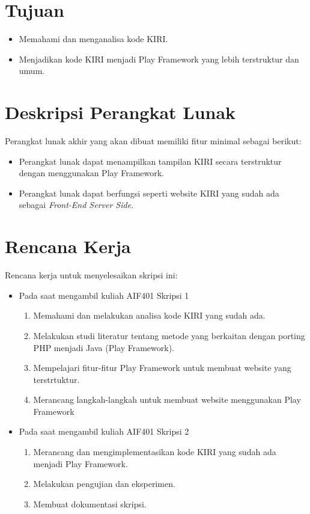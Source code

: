 \documentclass[a4paper,twoside]{article}
\begin{document}
\section{Tujuan}
\begin{itemize}
	\item Memahami dan menganalisa kode KIRI.
	\item Menjadikan kode KIRI menjadi Play Framework yang lebih terstruktur dan umum.
\end{itemize}

\section{Deskripsi Perangkat Lunak}
Perangkat lunak akhir yang akan dibuat memiliki fitur minimal sebagai berikut:
\begin{itemize}
	\item Perangkat lunak dapat menampilkan tampilan KIRI secara terstruktur dengan menggunakan Play Framework.
	\item Perangkat lunak dapat berfungsi seperti website KIRI yang sudah ada sebagai \textit{Front-End Server Side}.
\end{itemize}

\section{Rencana Kerja}

Rencana kerja untuk menyelesaikan skripsi ini:
\begin{itemize}
	\item Pada saat mengambil kuliah AIF401 Skripsi 1
	\begin{enumerate}
		\item Memahami dan melakukan analisa kode KIRI yang sudah ada.
		\item Melakukan studi literatur tentang metode yang berkaitan dengan porting PHP menjadi Java (Play Framework).
		\item Mempelajari fitur-fitur Play Framework untuk membuat website yang terstrtuktur.
		\item Merancang langkah-langkah untuk membuat website menggunakan Play Framework
	\end{enumerate}
	\item Pada saat mengambil kuliah AIF401 Skripsi 2
	\begin{enumerate}
		\item Merancang dan mengimplementasikan kode KIRI yang sudah ada menjadi Play Framework.
		\item Melakukan pengujian dan eksperimen.
		\item Membuat dokumentasi skripsi.
	\end{enumerate}
\end{itemize}
\end{document}
